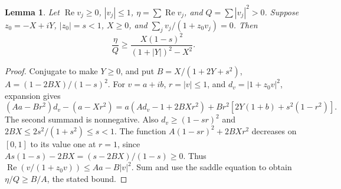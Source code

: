 \documentclass[11pt,reqno]{amsart}
\numberwithin{equation}{section}
\newtheorem{lemma}[theorem]{Lemma}
\theoremstyle{definition}
\theoremstyle{remark}
\renewcommand{\Re}{\operatorname{Re}}
\begin{document}
\begin{lemma}\label{mf:saddle-dual}
Let $\Re v_j\ge0$, $|v_j|\le1$, $\eta=\sum\Re v_j$, and
$Q=\sum|v_j|^2>0$. Suppose $z_0=-X+iY$, $|z_0|=s<1$,
$X\ge0$, and $\sum_jv_j/(1+z_0v_j)=0$. Then
\[
 \frac{\eta}{Q}\ge
 \frac{X(1-s)^2}{(1+|Y|)^2-X^2}.
\]
\end{lemma}
\begin{proof}
Conjugate to make $Y\ge0$, and put
$B=X/(1+2Y+s^2)$, $A=(1-2BX)/(1-s)^2$.
For $v=a+ib$, $r=|v|\le1$, and $d_v=|1+z_0v|^2$, expansion gives
\[
 (Aa-Br^2)d_v-(a-Xr^2)
 =a(Ad_v-1+2BXr^2)
   +Br^2[2Y(1+b)+s^2(1-r^2)].
\]
The second summand is nonnegative. Also $d_v\ge(1-sr)^2$ and
$2BX\le2s^2/(1+s^2)\le s<1$. The function
$A(1-sr)^2+2BXr^2$ decreases on $[0,1]$ to its value one
at $r=1$, since $As(1-s)-2BX=(s-2BX)/(1-s)\ge0$.
Thus $\Re(v/(1+z_0v))\le Aa-B|v|^2$. Sum and use the saddle
equation to obtain $\eta/Q\ge B/A$, the stated bound.
\end{proof}
\end{document}
